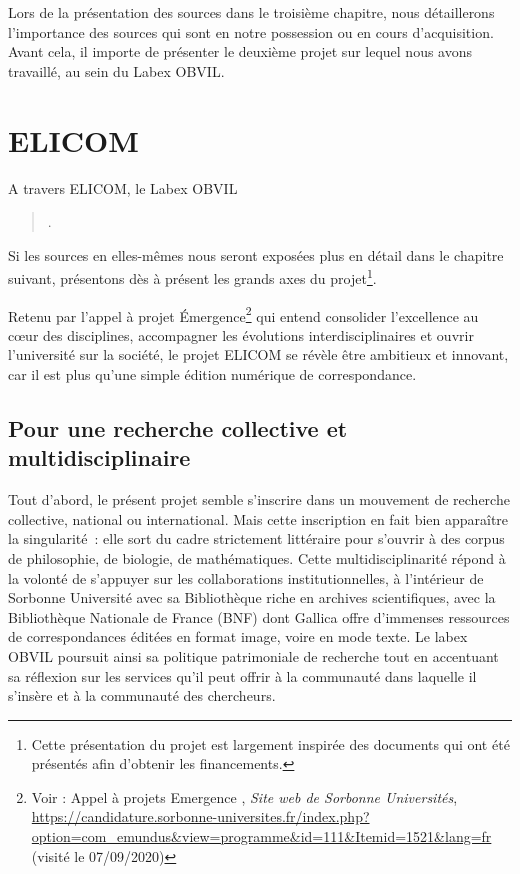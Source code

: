 Lors de la présentation des sources dans le troisième chapitre, nous détaillerons l'importance des sources qui sont en notre possession ou en cours d'acquisition. 
Avant cela, il importe de présenter le deuxième projet sur lequel nous avons travaillé, au sein du Labex OBVIL.




\section{ELICOM}

A travers ELICOM, le Labex OBVIL 
\begin{quote}
.
\end{quote}

Si les sources en elles-mêmes nous seront exposées plus en détail dans le chapitre suivant, présentons dès à présent les grands axes du projet\footnote{Cette présentation du projet est largement inspirée des documents qui ont été présentés afin d'obtenir les financements.}.

Retenu par l'appel à projet Émergence\footnote{Voir : Appel à projets Emergence , \emph{Site web de Sorbonne Universités}, \url{https://candidature.sorbonne-universites.fr/index.php?option=com_emundus&view=programme&id=111&Itemid=1521&lang=fr} (visité le 07/09/2020)} qui entend consolider l'excellence au c\oe ur des disciplines, accompagner les évolutions interdisciplinaires et ouvrir l'université sur la société, le projet ELICOM se révèle 
être ambitieux et innovant, car il est plus qu'une simple édition numérique de correspondance. 

\subsection{Pour une recherche collective et multidisciplinaire}

Tout d'abord, le présent projet semble s’inscrire dans un mouvement de recherche collective, national ou international. Mais cette inscription en fait bien apparaître la singularité : elle sort du cadre strictement littéraire pour s’ouvrir à des corpus de philosophie, de biologie, de mathématiques. Cette multidisciplinarité répond à la volonté de s’appuyer sur les collaborations institutionnelles, à l’intérieur de Sorbonne Université avec sa Bibliothèque riche en archives scientifiques, avec la Bibliothèque Nationale de France (BNF) dont Gallica offre d’immenses ressources de correspondances éditées en format image, voire en mode texte. Le labex OBVIL poursuit ainsi sa politique patrimoniale de recherche tout en accentuant sa réflexion sur les services qu’il peut offrir à la communauté dans laquelle il s’insère et à la communauté des chercheurs. 

